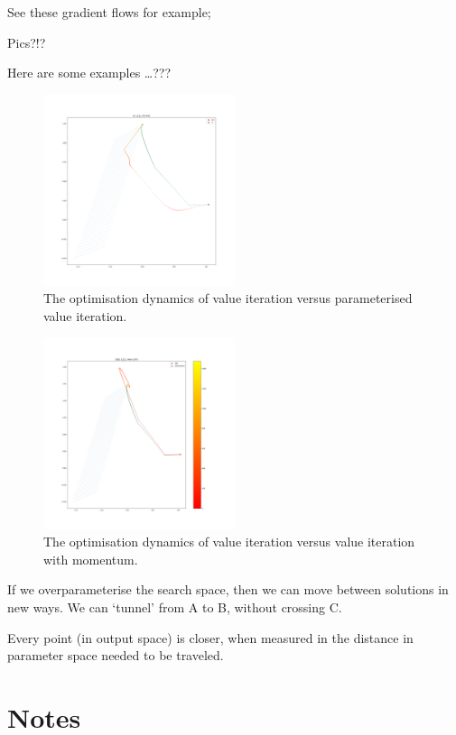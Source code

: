See these gradient flows for example;

Pics?!?

Here are some examples \ldots{}???

\begin{figure}
\centering
\includegraphics[width=0.5\textwidth,height=0.5\textheight]{../../pictures/figures/vi-vs-pvi.png}
\caption{The optimisation dynamics of value iteration versus parameterised value iteration.}
\end{figure}

\begin{figure}
\centering
\includegraphics[width=0.5\textwidth,height=0.5\textheight]{../../pictures/figures/vi_sgd-vs-vi_mom.png}
\caption{The optimisation dynamics of value iteration versus value iteration with momentum.}
\end{figure}

If we overparameterise the search space, then we can move between solutions in new ways. We can `tunnel' from A to B, without crossing C.

Every point (in output space) is closer, when measured in the distance in parameter space needed to be traveled.

\section{Notes}

